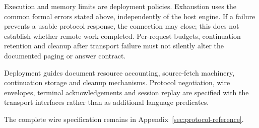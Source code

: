 Execution and memory limits are deployment policies. Exhaustion uses the
common formal errors stated above, independently of the host engine. If a
failure prevents a usable protocol response, the connection may close; this
does not establish whether remote work completed. Per-request budgets,
continuation retention and cleanup after transport failure must not silently
alter the documented paging or answer contract.

Deployment guides document resource accounting, source-fetch machinery,
continuation storage and cleanup mechanisms. Protocol negotiation, wire
envelopes, terminal acknowledgements and session replay are specified with
the transport interfaces rather than as additional language predicates.

The complete wire specification remains in Appendix~\ref{sec:protocol-reference}.

\endgroup
